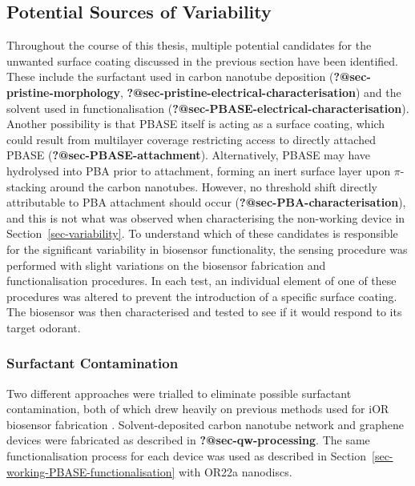 \documentclass[
  a4paper,
]{scrbook}
\begin{document}
\hypertarget{sec-contamination}{%
\subsection{Potential Sources of Variability}\label{sec-contamination}}

Throughout the course of this thesis, multiple potential candidates for
the unwanted surface coating discussed in the previous section have been
identified. These include the surfactant used in carbon nanotube
deposition (\textbf{?@sec-pristine-morphology},
\textbf{?@sec-pristine-electrical-characterisation}) and the solvent
used in functionalisation
(\textbf{?@sec-PBASE-electrical-characterisation}). Another possibility
is that PBASE itself is acting as a surface coating, which could result
from multilayer coverage restricting access to directly attached PBASE
(\textbf{?@sec-PBASE-attachment}). Alternatively, PBASE may have
hydrolysed into PBA prior to attachment, forming an inert surface layer
upon \(\pi\)-stacking around the carbon nanotubes. However, no threshold
shift directly attributable to PBA attachment should occur
(\textbf{?@sec-PBA-characterisation}), and this is not what was observed
when characterising the non-working device in
Section~\ref{sec-variability}. To understand which of these candidates
is responsible for the significant variability in biosensor
functionality, the sensing procedure was performed with slight
variations on the biosensor fabrication and functionalisation
procedures. In each test, an individual element of one of these
procedures was altered to prevent the introduction of a specific surface
coating. The biosensor was then characterised and tested to see if it
would respond to its target odorant.

\hypertarget{surfactant-contamination}{%
\subsubsection*{Surfactant
Contamination}\label{surfactant-contamination}}

Two different approaches were trialled to eliminate possible surfactant
contamination, both of which drew heavily on previous methods used for
iOR biosensor fabrication \autocite{Murugathas2019b,Murugathas2020}.
Solvent-deposited carbon nanotube network and graphene devices were
fabricated as described in \textbf{?@sec-qw-processing}. The same
functionalisation process for each device was used as described in
Section~\ref{sec-working-PBASE-functionalisation} with OR22a nanodiscs.
\end{document}
